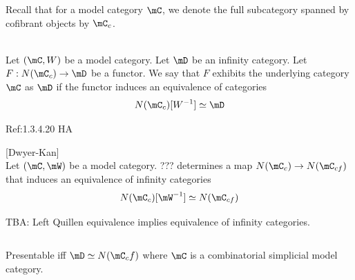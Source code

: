 \documentclass[a4paper]{article}
\begin{document}
Recall that for a model category $\mC$, we denote the full subcategory spanned by cofibrant objects by $\mC_c$. 

\begin{defn}{}{}\\ Let $(\mC,W)$ be a model category. Let $\mD$ be an infinity category. Let $F:N(\mC_c)\to\mD$ be a functor. We say that $F$ exhibits the underlying category $\mC$ as $\mD$ if the functor induces an equivalence of categories $$N(\mC_c)[W^{-1}]\simeq\mD$$
\end{defn}

Ref:1.3.4.20 HA

\begin{thm}{[Dwyer-Kan]}{}\\ Let $(\mC,\mW)$ be a model category. ??? determines a map $N(\mC_c)\to N(\mC_{cf})$ that induces an equivalence of infinity categories $$N(\mC_c)[\mW^{-1}]\simeq N(\mC_{cf})$$
\end{thm}

TBA: Left Quillen equivalence implies equivalence of infinity categories. 

\subsection{}
Presentable iff $\mD\simeq N(\mC_cf)$ where $\mC$ is a combinatorial simplicial model category. 
\end{document}
